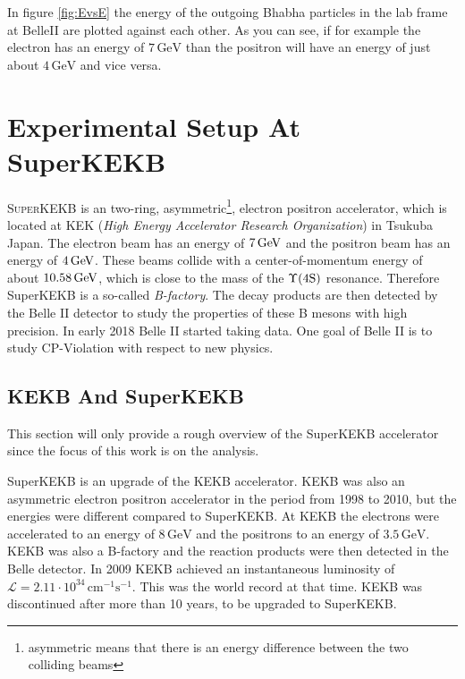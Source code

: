 \documentclass[a4paper,11pt,twosided,final,german,openbib,pdftex,listof=totoc,bibliography=totoc]{scrbook}
\begin{document}
In figure \ref{fig:EvsE} the energy of the outgoing Bhabha particles in the lab frame at BelleII are plotted against each other. As you can see, if for example the electron has an energy of $7\,\textrm{GeV}$ than the positron will have an energy of just about $4\,\textrm{GeV}$ and vice versa.










\chapter{Experimental Setup At SuperKEKB}
\label{sec:SetupKEK}

\lettrine{S}{uperKEKB} is an two-ring, asymmetric\footnote{asymmetric means that there is an energy difference between the two colliding beams}, electron positron accelerator, which is located at KEK (\textit{High Energy Accelerator Research Organization}) in Tsukuba Japan. 
The electron beam has an energy of $7\,\textnormal{GeV}$ 
and the positron beam has an energy of $4\,\textnormal{GeV}$. These beams collide with a center-of-momentum energy of about $10.58\,\textnormal{GeV}$, which is close to the mass of the $\Upsilon(4\textnormal{S})$ resonance. Therefore SuperKEKB is a so-called \textit{B-factory}. The decay products are then detected by the  Belle II detector to study the properties of these B mesons with high precision. In early 2018 Belle II started taking data. One goal of Belle II is to study CP-Violation with respect to new physics.\cite{B2B}

\section{KEKB And SuperKEKB}
\label{sec:KEK}
This section will only provide a rough overview of the SuperKEKB accelerator since the focus of this work is on the analysis. 

SuperKEKB is an upgrade of the KEKB accelerator. KEKB was also an asymmetric electron positron accelerator in the period from 1998 to 2010, but the energies were different compared to SuperKEKB. At KEKB the electrons were accelerated to an energy of $8\,\textrm{GeV}$ and the positrons to an energy of $3.5\,\textrm{GeV}$. KEKB was also a B-factory and the reaction products were then detected in the Belle detector. In 2009 KEKB achieved an instantaneous luminosity of $\mathcal{L} = 2.11 \cdot 10^{34}\,\textrm{cm}^{-1}\textrm{s}^{-1}$. This was the world record at that time. KEKB was discontinued after more than 10 years, to be upgraded to SuperKEKB.\cite{PTEP}
\end{document}
